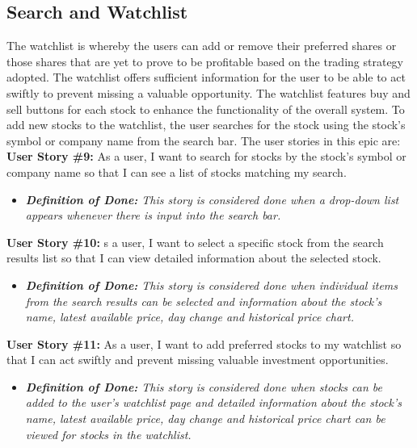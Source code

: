 \subsection{Search and Watchlist}
    \label{subsec:search_watchlist}

The watchlist is whereby the users can add or remove their preferred shares or those shares that are yet to prove to be profitable based on the trading strategy adopted. The watchlist offers sufficient information for the user to be able to act swiftly to prevent missing a valuable opportunity. The watchlist features buy and sell buttons for each stock to enhance the functionality of the overall system. To add new stocks to the watchlist, the user searches for the stock using the stock's symbol or company name from the search bar. The user stories in this epic are:\\

\noindent \textbf{User Story \#9:} As a user, I want to search for stocks by the stock’s symbol or company name so that I can see a list of stocks matching my search. 
\begin{itemize}
	\item \textit{\textbf{Definition of Done:} This story is considered done when a drop-down list appears whenever there is input into the search bar.} 
\end{itemize}

\noindent \textbf{User Story \#10:} s a user, I want to select a specific stock from the search results list so that I can view detailed information about the selected stock. 
\begin{itemize}
	\item \textit{\textbf{Definition of Done:} This story is considered done when individual items from the search results can be selected and information about the stock’s name, latest available price, day change and historical price chart.} 
\end{itemize}


\noindent \textbf{User Story \#11:} As a user, I want to add preferred stocks to my watchlist so that I can act swiftly and prevent missing valuable investment opportunities.
\begin{itemize}
	\item \textit{\textbf{Definition of Done:} This story is considered done when stocks can be added to the user’s watchlist page and detailed information about the stock’s name, latest available price, day change and historical price chart can be viewed for stocks in the watchlist.} 
\end{itemize}


